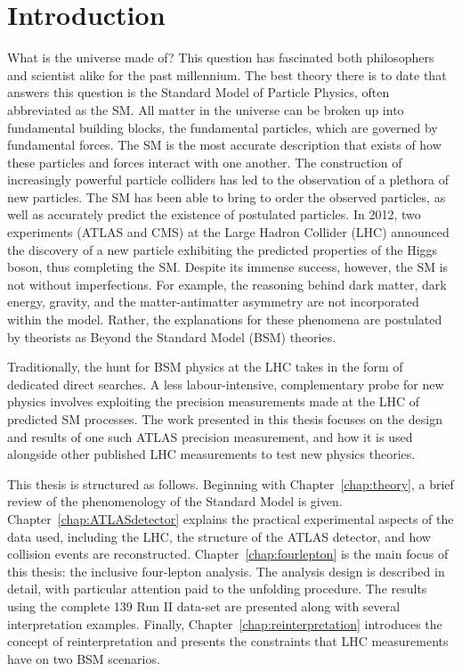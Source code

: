 \chapter{Introduction}
\label{chap:intro}
What is the universe made of? This question has fascinated both philosophers and scientist alike for the past millennium. The best theory there is to date that answers this question is the Standard Model of Particle Physics, often abbreviated as the SM. All matter in the universe can be broken up into fundamental building blocks, the fundamental particles, which are governed by fundamental forces. The SM is the most accurate description that exists of how these particles and forces interact with one another. The construction of increasingly powerful particle colliders has led to the observation of a plethora of new particles. The SM has been able to bring to order the observed particles, as well as accurately predict the existence of postulated particles. In 2012, two experiments (ATLAS and CMS) at the Large Hadron Collider (LHC) announced the discovery of a new particle exhibiting the predicted properties of the Higgs boson, thus completing the SM. Despite its immense success, however, the SM is not without imperfections. For example, the reasoning behind dark matter, dark energy, gravity, and the matter-antimatter asymmetry are not incorporated within the model. Rather, the explanations for these phenomena are postulated by theorists as Beyond the Standard Model (BSM) theories. 

Traditionally, the hunt for BSM physics at the LHC takes in the form of dedicated direct searches. A less labour-intensive, complementary probe for new physics involves exploiting the precision measurements made at the LHC of predicted SM processes. The work presented in this thesis focuses on the design and results of one such ATLAS precision measurement, and how it is used alongside other published LHC measurements to test new physics theories.

This thesis is structured as follows. Beginning with Chapter~\ref{chap:theory}, a brief review of the phenomenology of the Standard Model is given. Chapter~\ref{chap:ATLASdetector} explains the practical experimental aspects of the data used, including the LHC, the structure of the ATLAS detector, and how collision events are reconstructed. Chapter~\ref{chap:fourlepton} is the main focus of this thesis: the \ATLAS inclusive four-lepton analysis. The analysis design is described in detail, with particular attention paid to the unfolding procedure. The results using the complete \unit{139}{\invfb} Run II data-set are presented along with several interpretation examples. Finally, Chapter~\ref{chap:reinterpretation} introduces the concept of reinterpretation and presents the constraints that LHC measurements have on two BSM scenarios. 

